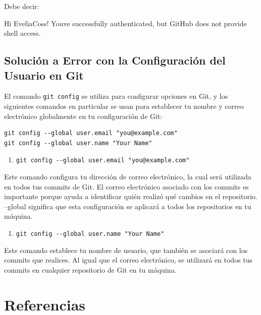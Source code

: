 \documentclass[
  spanish,
  12pt,
  letterpaper,
  DIV=11,
  numbers=noendperiod]{scrreprt}
\newenvironment{Shaded}{\begin{snugshade}}{\end{snugshade}}
\newcommand{\ExtensionTok}[1]{\textcolor[rgb]{0.00,0.23,0.31}{#1}}
\newcommand{\NormalTok}[1]{\textcolor[rgb]{0.00,0.23,0.31}{#1}}
\newcommand{\StringTok}[1]{\textcolor[rgb]{0.13,0.47,0.30}{#1}}
\providecommand{\tightlist}{%
  \setlength{\itemsep}{0pt}\setlength{\parskip}{0pt}}
\begin{document}
Debe decir:

\begin{Shaded}
\begin{Highlighting}[]
\ExtensionTok{Hi}\NormalTok{ EveliaCoss! You}\StringTok{\textquotesingle{}ve successfully authenticated, but GitHub does not provide shell access.}
\end{Highlighting}
\end{Shaded}

\subsection{Solución a Error con la Configuración del Usuario en
Git}\label{soluciuxf3n-a-error-con-la-configuraciuxf3n-del-usuario-en-git}

El comando \texttt{git\ config} se utiliza para configurar opciones en
Git, y los siguientes comandos en particular se usan para establecer tu
nombre y correo electrónico globalmente en tu configuración de Git:

\begin{verbatim}
git config --global user.email "you@example.com"
git config --global user.name "Your Name"
\end{verbatim}

\begin{enumerate}
\def\labelenumi{\arabic{enumi}.}
\tightlist
\item
  \texttt{git\ config\ -\/-global\ user.email\ "you@example.com"}
\end{enumerate}

Este comando configura tu dirección de correo electrónico, la cual será
utilizada en todos tus commits de Git. El correo electrónico asociado
con los commits es importante porque ayuda a identificar quién realizó
qué cambios en el repositorio. --global significa que esta configuración
se aplicará a todos los repositorios en tu máquina.

\begin{enumerate}
\def\labelenumi{\arabic{enumi}.}
\setcounter{enumi}{1}
\tightlist
\item
  \texttt{git\ config\ -\/-global\ user.name\ "Your\ Name"}
\end{enumerate}

Este comando establece tu nombre de usuario, que también se asociará con
los commits que realices. Al igual que el correo electrónico, se
utilizará en todos tus commits en cualquier repositorio de Git en tu
máquina.

\section{Referencias}\label{referencias-12}
\end{document}
